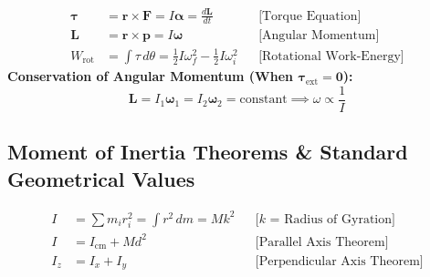 \documentclass[10pt,twoside,openright]{book}
\begin{document}
\begin{formulabox}
\begin{align}
  \boldsymbol{\tau} &= \mathbf{r} \times \mathbf{F} = I\boldsymbol{\alpha} = \frac{d\mathbf{L}}{dt} && \text{[Torque Equation]} \\
  \mathbf{L} &= \mathbf{r} \times \mathbf{p} = I\boldsymbol{\omega} && \text{[Angular Momentum]} \\
  W_{\text{rot}} &= \int \tau\,d\theta = \frac{1}{2}I\omega_f^2 - \frac{1}{2}I\omega_i^2 && \text{[Rotational Work-Energy]}
\end{align}
\textbf{Conservation of Angular Momentum (When $\boldsymbol{\tau}_{\text{ext}} = \mathbf{0}$):}
\begin{equation}
  \mathbf{L} = I_1 \boldsymbol{\omega}_1 = I_2 \boldsymbol{\omega}_2 = \text{constant} \implies \omega \propto \frac{1}{I}
\end{equation}
\end{formulabox}

\subsection{Moment of Inertia Theorems \& Standard Geometrical Values}

\begin{formulabox}
\begin{align}
  I &= \sum m_i r_i^2 = \int r^2\,dm = M k^2 && \text{[$k$ = Radius of Gyration]} \\
  I &= I_{\text{cm}} + M d^2 && \text{[Parallel Axis Theorem]} \\
  I_z &= I_x + I_y && \text{[Perpendicular Axis Theorem]}
\end{align}
\end{formulabox}
\end{document}
